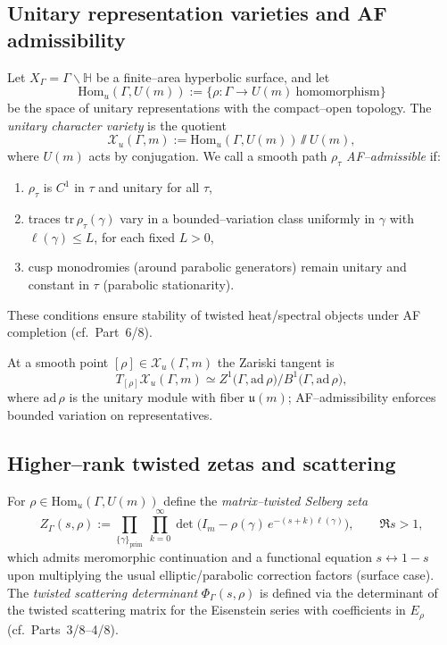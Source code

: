 \subsection{Unitary representation varieties and AF admissibility}
\label{subsec:af-rep-var}
\relax\hspace{0pt}

Let $X_\Gamma=\Gamma\backslash\mathbb{H}$ be a finite–area hyperbolic surface, and let
\[
\mathrm{Hom}_u(\Gamma,U(m)):=\{\rho:\Gamma\to U(m)\ \text{homomorphism}\}
\]
be the space of unitary representations with the compact–open topology. The \emph{unitary character variety} is the quotient
\[
\mathcal{X}_u(\Gamma,m):=\mathrm{Hom}_u(\Gamma,U(m))\sslash U(m),
\]
where $U(m)$ acts by conjugation. We call a smooth path $\rho_\tau$ \emph{AF–admissible} if:
\begin{enumerate}[label=\textnormal{(A\arabic*)},leftmargin=1.2em]
\item $\rho_\tau$ is $C^1$ in $\tau$ and unitary for all $\tau$, %
\item traces $\mathrm{tr}\,\rho_\tau(\gamma)$ vary in a bounded–variation class uniformly in $\gamma$ with $\ell(\gamma)\le L$, for each fixed $L>0$, %
\item cusp monodromies (around parabolic generators) remain unitary and constant in $\tau$ (parabolic stationarity). %
\end{enumerate}
These conditions ensure stability of twisted heat/spectral objects under AF completion (cf.\ Part~6/8).

\begin{remark}
At a smooth point $[\rho]\in\mathcal{X}_u(\Gamma,m)$ the Zariski tangent is
\[
T_{[\rho]}\mathcal{X}_u(\Gamma,m)\simeq
Z^1\!\big(\Gamma,\mathrm{ad}\,\rho\big)\big/\!B^1\!\big(\Gamma,\mathrm{ad}\,\rho\big),
\]
where $\mathrm{ad}\,\rho$ is the unitary module with fiber $\mathfrak{u}(m)$; AF–admissibility enforces bounded variation on representatives. %
\end{remark}

\subsection{Higher–rank twisted zetas and scattering}
\label{subsec:af-hr-twists}
\relax\hspace{0pt}

For $\rho\in\mathrm{Hom}_u(\Gamma,U(m))$ define the \emph{matrix–twisted Selberg zeta}
\begin{equation}\label{eq:hr-selberg}
Z_\Gamma(s,\rho):=\prod_{\{\gamma\}_{\mathrm{prim}}}\ \prod_{k=0}^\infty
\det\!\big(I_m-\rho(\gamma)\,e^{-(s+k)\ell(\gamma)}\big),
\qquad \Re s>1,
\end{equation}
which admits meromorphic continuation and a functional equation $s\leftrightarrow 1-s$ upon multiplying the usual elliptic/parabolic correction factors (surface case). The \emph{twisted scattering determinant} $\Phi_\Gamma(s,\rho)$ is defined via the determinant of the twisted scattering matrix for the Eisenstein series with coefficients in $E_\rho$ (cf.\ Parts~3/8–4/8).

